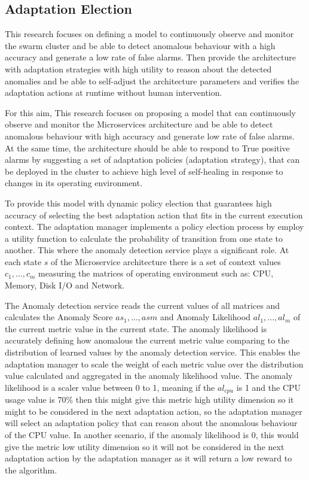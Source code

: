 \documentclass[graybox]{svmult}
\begin{document}
\subsection{Adaptation Election}
\label{sec:mapk}
This research focuses on defining a model to continuously observe and monitor the swarm cluster and be able to detect anomalous behaviour with a high accuracy and generate a low rate of false alarms. Then provide the architecture with adaptation strategies with high utility to reason about the detected anomalies and be able to self-adjust the architecture parameters and verifies the adaptation actions at runtime without human intervention.  

For this aim, This research focuses on proposing a model that can continuously observe and monitor the Microservices architecture and be able to detect anomalous behaviour with high accuracy and generate low rate of false alarms. At the same time, the architecture should be able to respond to True positive alarms by suggesting a set of adaptation policies (adaptation strategy), that can be deployed in the cluster to achieve high level of self-healing in response to changes in its operating environment.  

To provide this model with dynamic policy election that guarantees high accuracy of selecting the best adaptation action that fits in the current execution context. The adaptation manager implements a policy election process by employ a utility function to calculate the probability of transition from one state to another. This where the anomaly detection service plays a significant role. At each state $s$ of the Microservice architecture there is a set of context values $c_{1},...,c_{m}$ measuring the matrices of operating environment such as: CPU, Memory, Disk I/O and Network. 

The Anomaly detection service reads the current values of all matrices and calculates the Anomaly Score $as_{1},..., as{m}$ and Anomaly Likelihood $al_{1},...,al_{m}$ of the current metric value in the current state. The anomaly likelihood is accurately defining how anomalous the current metric value comparing to the distribution of learned values by the anomaly detection service. This enables the adaptation manager to scale the weight of each metric value over the distribution value calculated and aggregated in the anomaly likelihood value. The anomaly likelihood is a scaler value between 0 to 1, meaning if the $al_{cpu}$ is 1 and the CPU usage value is 70\% then this might give this metric high utility dimension so it might to be considered in the next adaptation action, so the adaptation manager will select an adaptation policy that can reason about the anomalous behaviour of the CPU value. In another scenario, if the anomaly likelihood is 0, this would give the metric low utility dimension so it will not be considered in the next adaptation action by the adaptation manager as it will return a low reward to the algorithm. 
 
\end{document}
